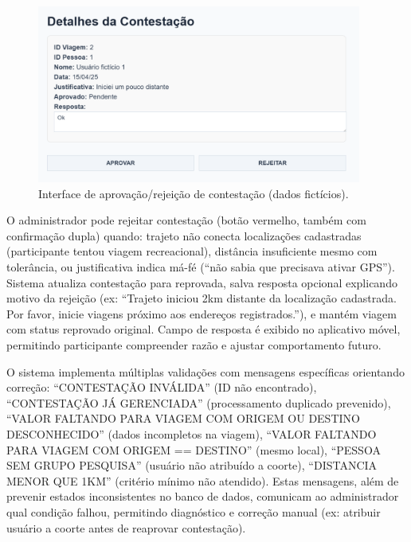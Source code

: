  
\begin{figure}[H]
    \centering
    \includegraphics[width=0.95\textwidth]{figuras/contestacao_aprovar.PNG}
    \caption{Interface de aprovação/rejeição de contestação (dados fictícios).}
    \label{fig:contestacao_aprovar}
  \end{figure}

O administrador pode rejeitar contestação (botão vermelho, também com confirmação dupla) quando: trajeto não conecta localizações cadastradas (participante tentou viagem recreacional), distância insuficiente mesmo com tolerância, ou justificativa indica má-fé (``não sabia que precisava ativar GPS''). Sistema atualiza contestação para reprovada, salva resposta opcional explicando motivo da rejeição (ex: ``Trajeto iniciou 2km distante da localização cadastrada. Por favor, inicie viagens próximo aos endereços registrados.''), e mantém viagem com status reprovado original. Campo de resposta é exibido no aplicativo móvel, permitindo participante compreender razão e ajustar comportamento futuro.

O sistema implementa múltiplas validações com mensagens específicas orientando correção: ``CONTESTAÇÃO INVÁLIDA'' (ID não encontrado), ``CONTESTAÇÃO JÁ GERENCIADA'' (processamento duplicado prevenido), ``VALOR FALTANDO PARA VIAGEM COM ORIGEM OU DESTINO DESCONHECIDO'' (dados incompletos na viagem), ``VALOR FALTANDO PARA VIAGEM COM ORIGEM == DESTINO'' (mesmo local), ``PESSOA SEM GRUPO PESQUISA'' (usuário não atribuído a coorte), ``DISTANCIA MENOR QUE 1KM'' (critério mínimo não atendido). Estas mensagens, além de prevenir estados inconsistentes no banco de dados, comunicam ao administrador qual condição falhou, permitindo diagnóstico e correção manual (ex: atribuir usuário a coorte antes de reaprovar contestação).
